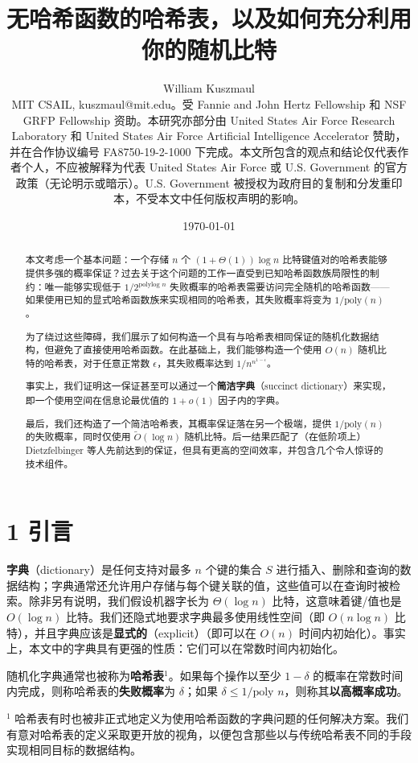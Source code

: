 \documentclass[12pt,a4paper]{ctexart}
\title{无哈希函数的哈希表，以及如何充分利用你的随机比特}
\author{William Kuszmaul \\
MIT CSAIL, kuszmaul@mit.edu。受 Fannie and John Hertz Fellowship 和 NSF GRFP Fellowship 资助。本研究亦部分由 United States Air Force Research Laboratory 和 United States Air Force Artificial Intelligence Accelerator 赞助，并在合作协议编号 FA8750-19-2-1000 下完成。本文所包含的观点和结论仅代表作者个人，不应被解释为代表 United States Air Force 或 U.S. Government 的官方政策（无论明示或暗示）。U.S. Government 被授权为政府目的复制和分发重印本，不受本文中任何版权声明的影响。}
\date{\today}
\theoremstyle{remark}
\begin{document}
\maketitle

\begin{abstract}
本文考虑一个基本问题：一个存储 $n$ 个 $(1 + \Theta(1))\log n$ 比特键值对的哈希表能够提供多强的概率保证？过去关于这个问题的工作一直受到已知哈希函数族局限性的制约：唯一能够实现低于 $1/2^{\text{polylog } n}$ 失败概率的哈希表需要访问完全随机的哈希函数——如果使用已知的显式哈希函数族来实现相同的哈希表，其失败概率将变为 $1/\text{poly}(n)$。

为了绕过这些障碍，我们展示了如何构造一个具有与哈希表相同保证的随机化数据结构，但避免了直接使用哈希函数。在此基础上，我们能够构造一个使用 $O(n)$ 随机比特的哈希表，对于任意正常数 $\epsilon$，其失败概率达到 $1/n^{n^{1-\epsilon}}$。

事实上，我们证明这一保证甚至可以通过一个\textbf{简洁字典}（succinct dictionary）来实现，即一个使用空间在信息论最优值的 $1+o(1)$ 因子内的字典。

最后，我们还构造了一个简洁哈希表，其概率保证落在另一个极端，提供 $1/\text{poly}(n)$ 的失败概率，同时仅使用 $\tilde{O}(\log n)$ 随机比特。后一结果匹配了（在低阶项上）Dietzfelbinger 等人先前达到的保证，但具有更高的空间效率，并包含几个令人惊讶的技术组件。
\end{abstract}



\medskip
\section{1 引言}
\textbf{字典}（dictionary）是任何支持对最多 $n$ 个键的集合 $S$ 进行插入、删除和查询的数据结构；字典通常还允许用户存储与每个键关联的值，这些值可以在查询时被检索。除非另有说明，我们假设机器字长为 $\Theta(\log n)$ 比特，这意味着键/值也是 $O(\log n)$ 比特。我们还隐式地要求字典最多使用线性空间（即 $O(n\log n)$ 比特），并且字典应该是\textbf{显式的}（explicit）（即可以在 $O(n)$ 时间内初始化）。事实上，本文中的字典具有更强的性质：它们可以在常数时间内初始化。

随机化字典通常也被称为\textbf{哈希表}$^1$。如果每个操作以至少 $1-\delta$ 的概率在常数时间内完成，则称哈希表的\textbf{失败概率}为 $\delta$；如果 $\delta \leq 1/\text{poly } n$，则称其\textbf{以高概率成功}。

$^1$ 哈希表有时也被非正式地定义为使用哈希函数的字典问题的任何解决方案。我们有意对哈希表的定义采取更开放的视角，以便包含那些以与传统哈希表不同的手段实现相同目标的数据结构。
\end{document}
